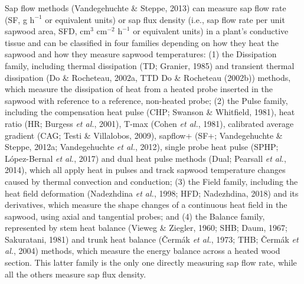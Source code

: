 \documentclass[11pt,twoside]{reedthesis}
\begin{document}
Sap flow methods (Vandegehuchte \& Steppe, 2013) can measure sap flow
rate (SF, g \(\text{h}^{-1}\) or equivalent units) or sap flux density
(i.e., sap flow rate per unit sapwood area, SFD, \(\text{cm}^3\)
\(\text{cm}^{-2}\) \(\text{h}^{-1}\) or equivalent units) in a plant's
conductive tissue and can be classified in four families depending on
how they heat the sapwood and how they measure sapwood temperatures: (1)
the Dissipation family, including thermal dissipation (TD; Granier,
1985) and transient thermal dissipation (Do \& Rocheteau, 2002a, TTD Do
\& Rocheteau (2002b)) methods, which measure the dissipation of heat
from a heated probe inserted in the sapwood with reference to a
reference, non-heated probe; (2) the Pulse family, including the
compensation heat pulse (CHP; Swanson \& Whitfield, 1981), heat ratio
(HR; Burgess \emph{et al.}, 2001), T-max (Cohen \emph{et al.}, 1981),
calibrated average gradient (CAG; Testi \& Villalobos, 2009), sapflow+
(SF+; Vandegehuchte \& Steppe, 2012a; Vandegehuchte \emph{et al.},
2012), single probe heat pulse (SPHP; López-Bernal \emph{et al.}, 2017)
and dual heat pulse methods (Dual; Pearsall \emph{et al.}, 2014), which
all apply heat in pulses and track sapwood temperature changes caused by
thermal convection and conduction; (3) the Field family, including the
heat field deformation (Nadezhdina \emph{et al.}, 1998; HFD; Nadezhdina,
2018) and its derivatives, which measure the shape changes of a
continuous heat field in the sapwood, using axial and tangential probes;
and (4) the Balance family, represented by stem heat balance (Vieweg \&
Ziegler, 1960; SHB; Daum, 1967; Sakuratani, 1981) and trunk heat balance
(Čermák \emph{et al.}, 1973; THB; Čermák \emph{et al.}, 2004) methods,
which measure the energy balance across a heated wood section. This
latter family is the only one directly measuring sap flow rate, while
all the others measure sap flux density.\par
\end{document}

